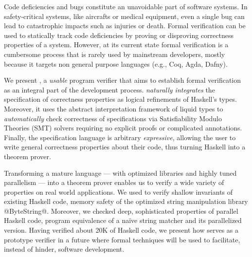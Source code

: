 Code deficiencies and bugs constitute an unavoidable part of software systems.
%
In safety-critical systems, like aircrafts or medical equipment, 
even a single bug can lead to catastrophic impacts
such as injuries or death.
%
Formal verification can be used to statically 
track code deficiencies by proving or disproving correctness properties 
of a system. 
%
However, at its current state formal verification is a cumbersome process
that is rarely used by mainstream developers, mostly because it targets non general purpose languages (e.g., Coq, Agda, Dafny).

We present \toolname, a \textit{usable} program verifier that aims to
establish formal verification as an
integral part of the development process.
%
\toolname \textit{naturally integrates}
the specification of correctness properties
as logical refinements of Haskell's types. 
%
Moreover, it uses the abstract interpretation framework of liquid types
to \textit{automatically} check correctness of specifications via 
Satisfiability Modulo Theories (SMT) solvers
requiring no explicit proofs or complicated annotations.
%
Finally, the specification language is arbitrary \textit{expressive},
allowing the user to write general correctness properties about their code, 
thus turning Haskell into a theorem prover. 

Transforming a mature language 
--- with optimized libraries and highly tuned parallelism ---
into a theorem prover enables us to verify a wide variety of properties 
on real world applications.
%
We used \toolname to verify shallow invariants of existing Haskell code, 
\eg memory safety of the optimized string manipulation library @ByteString@.
%
Moreover, we checked deep, sophisticated properties of parallel Haskell code, 
\eg program equivalence of a na\"ive string matcher and its parallelized version. 
%
Having verified about 20K of Haskell code, we present how \toolname 
serves as a prototype verifier in a future where formal techniques will 
be used to facilitate, instead of hinder, software development. 